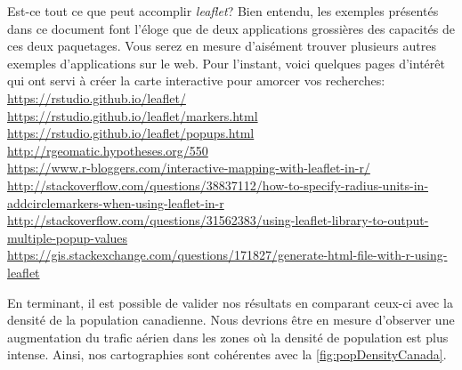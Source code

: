 \begin{moreInfo}{Est-ce tout ce que peut accomplir \emph{leaflet}?}
	Bien entendu, les exemples présentés dans ce document font l'éloge que de deux applications grossières des capacités de ces deux paquetages. Vous serez en mesure d'aisément trouver plusieurs autres exemples d'applications sur le web. Pour l'instant, voici quelques pages d'intérêt qui ont servi à créer la carte interactive pour amorcer vos recherches: \\
	\url{https://rstudio.github.io/leaflet/} \\
	\url{https://rstudio.github.io/leaflet/markers.html} \\
	\url{https://rstudio.github.io/leaflet/popups.html} \\
	\url{http://rgeomatic.hypotheses.org/550} \\
	\url{https://www.r-bloggers.com/interactive-mapping-with-leaflet-in-r/} \\
	\url{http://stackoverflow.com/questions/38837112/how-to-specify-radius-units-in-addcirclemarkers-when-using-leaflet-in-r} \\
	\url{http://stackoverflow.com/questions/31562383/using-leaflet-library-to-output-multiple-popup-values} \\
	\url{https://gis.stackexchange.com/questions/171827/generate-html-file-with-r-using-leaflet}
\end{moreInfo}

\noindent
En terminant, il est possible de valider nos résultats en comparant ceux-ci avec la densité de la population canadienne. Nous devrions être en mesure d'observer une augmentation du trafic aérien dans les zones où la densité de population est plus intense. Ainsi, nos cartographies sont cohérentes avec la \autoref{fig:popDensityCanada}.

